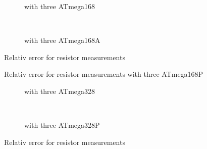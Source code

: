 \begin{figure}[H]
  \begin{subfigure}[b]{9cm}
    \centering
    \resizebox{9cm}{!}{}
    \caption{with three ATmega168}
    \label{fig:m168res_all}
  \end{subfigure}
  ~
  \begin{subfigure}[b]{9cm}
    \centering
    \resizebox{9cm}{!}{}
    \caption{with three ATmega168A}
    \label{fig:m168ares_all}
  \end{subfigure}
\caption{Relativ error for resistor measurements}
\end{figure}

\begin{figure}[H]
\centering

\caption{Relativ error for resistor measurements with three ATmega168P }
\label{fig:m168pres_all}
\end{figure}

\begin{figure}[H]
  \begin{subfigure}[b]{9cm}
    \centering
    \resizebox{9cm}{!}{}
    \caption{with three ATmega328}
    \label{fig:m328res_all}
  \end{subfigure}
  ~
  \begin{subfigure}[b]{9cm}
    \centering
    \resizebox{9cm}{!}{}
    \caption{with three ATmega328P}
    \label{fig:m328pres_all}
  \end{subfigure}
\caption{Relativ error for resistor measurements}
\end{figure}

